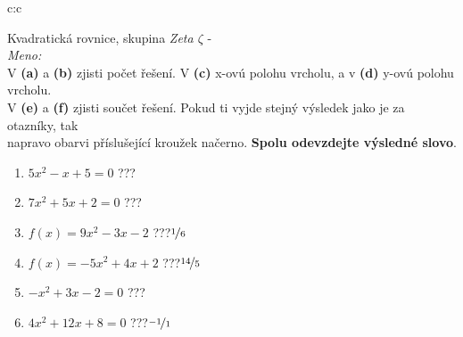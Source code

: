 \documentclass[10pt]{report}
\begin{document}
\clearpage
\thispagestyle{empty}
\begin{tabular}{c:c}
\begin{minipage}[c][99mm][t]{0.49\linewidth}
\begin{center}
\vspace{7mm}
{\huge Kvadratická rovnice, skupina \textit{Zeta $\zeta$} -}\\[4.5mm]
\textit{Meno:}\phantom{xxxxxxxxxxxxxxxxxxxxxxxxxxxxxxxxxxxxxxxxxxxxxxxxxxxxxxxxxxxxxxxxx}\\[3.5mm]
V \textbf{(a)} a \textbf{(b)} zjisti počet řešení. V \textbf{(c)} x-ovú polohu vrcholu, a v \textbf{(d)} y-ovú polohu vrcholu.\\V \textbf{(e)} a \textbf{(f)} zjisti součet řešení. Pokud ti vyjde stejný výsledek jako je za otazníky, tak\\napravo obarvi příslušející kroužek načerno. \textbf{Spolu odevzdejte výsledné slovo}.\\[3mm]
\begin{minipage}{0.77\linewidth}
\begin{center}
\begin{varwidth}{\textwidth}
\begin{enumerate}
\large
\item $5x^2-x+5=0$\quad \dotfill\; ???\;\dotfill {}
\item $7x^2+5x+2=0$\quad \dotfill\; ???\;\dotfill {}
\item $f(x)=9x^2-3x-2$\quad \dotfill\; ???\;\dotfill \quad $\nicefrac{1}{6}$
\item $f(x)=-5x^2+4x+2$\quad \dotfill\; ???\;\dotfill \quad $\nicefrac{14}{5}$
\item $-x^2+3x-2=0$\quad \dotfill\; ???\;\dotfill {}
\item $4x^2+12x+8=0$\quad \dotfill\; ???\;\dotfill \quad $\nicefrac{-1}{1}$
\end{enumerate}
\end{varwidth}
\end{center}
\end{minipage}

\end{center}
\end{minipage}
\end{tabular}
\end{document}
